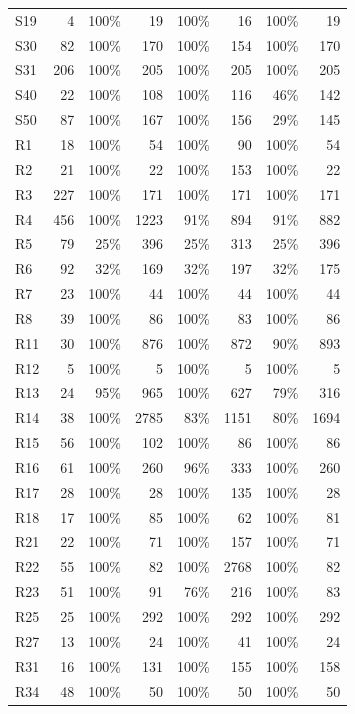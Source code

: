 {\begin{longtable}{@{}lrrrrrrr@{}}
	S19 & 4 & 100\% & 19 & 100\% & 16 & 100\% & 19 \\
	S30 & 82 & 100\% & 170 & 100\% & 154 & 100\% & 170 \\
	S31 & 206 & 100\% & 205 & 100\% & 205 & 100\% & 205 \\
	S40 & 22 & 100\% & 108 & 100\% & 116 & 46\% & 142 \\
	S50 & 87 & 100\% & 167 & 100\% & 156 & 29\% & 145 \\
	R1 & 18 & 100\% & 54 & 100\% & 90 & 100\% & 54 \\
	R2 & 21 & 100\% & 22 & 100\% & 153 & 100\% & 22 \\
	R3 & 227 & 100\% & 171 & 100\% & 171 & 100\% & 171 \\
	R4 & 456 & 100\% & 1223 & 91\% & 894 & 91\% & 882 \\
	R5 & 79 & 25\% & 396 & 25\% & 313 & 25\% & 396 \\
	R6 & 92 & 32\% & 169 & 32\% & 197 & 32\% & 175 \\
	R7 & 23 & 100\% & 44 & 100\% & 44 & 100\% & 44 \\
	R8 & 39 & 100\% & 86 & 100\% & 83 & 100\% & 86 \\
	R11 & 30 & 100\% & 876 & 100\% & 872 & 90\% & 893 \\
	R12 & 5 & 100\% & 5 & 100\% & 5 & 100\% & 5 \\
	R13 & 24 & 95\% & 965 & 100\% & 627 & 79\% & 316 \\
	R14 & 38 & 100\% & 2785 & 83\% & 1151 & 80\% & 1694 \\
	R15 & 56 & 100\% & 102 & 100\% & 86 & 100\% & 86 \\
	R16 & 61 & 100\% & 260 & 96\% & 333 & 100\% & 260 \\
	R17 & 28 & 100\% & 28 & 100\% & 135 & 100\% & 28 \\
	R18 & 17 & 100\% & 85 & 100\% & 62 & 100\% & 81 \\
	R21 & 22 & 100\% & 71 & 100\% & 157 & 100\% & 71 \\
	R22 & 55 & 100\% & 82 & 100\% & 2768 & 100\% & 82 \\
	R23 & 51 & 100\% & 91 & 76\% & 216 & 100\% & 83 \\
	R25 & 25 & 100\% & 292 & 100\% & 292 & 100\% & 292 \\
	R27 & 13 & 100\% & 24 & 100\% & 41 & 100\% & 24 \\
	R31 & 16 & 100\% & 131 & 100\% & 155 & 100\% & 158 \\
	R34 & 48 & 100\% & 50 & 100\% & 50 & 100\% & 50 \\

\end{longtable}}

